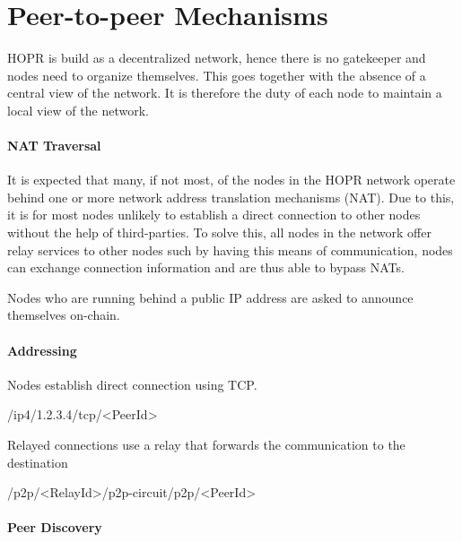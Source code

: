 \section{Peer-to-peer Mechanisms}

HOPR is build as a decentralized network, hence there is no gatekeeper and nodes need to organize themselves. This goes together with the absence of a central view of the network. It is therefore the duty of each node to maintain a local view of the network.

\paragraph{NAT Traversal}
It is expected that many, if not most, of the nodes in the HOPR network operate behind one or more network address translation mechanisms (NAT). Due to this, it is for most nodes unlikely to establish a direct connection to other nodes without the help of third-parties. To solve this, all nodes in the network offer relay services to other nodes such by having this means of communication,
nodes can exchange connection information and are thus able to bypass NATs.

Nodes who are running behind a public IP address are asked to announce themselves on-chain.


\paragraph{Addressing}

Nodes establish direct connection using TCP.

\begin{center}
    \textsf{/ip4/1.2.3.4/tcp/}\textless\textsf{PeerId}\textgreater{}
\end{center}

Relayed connections use a relay that forwards the communication to the destination

\begin{center}
    \textsf{/p2p/}\textless\textsf{RelayId}\textgreater\textsf{/p2p-circuit/p2p/}\textless{}\textsf{PeerId}\textgreater{}
\end{center}

\paragraph{Peer Discovery}

